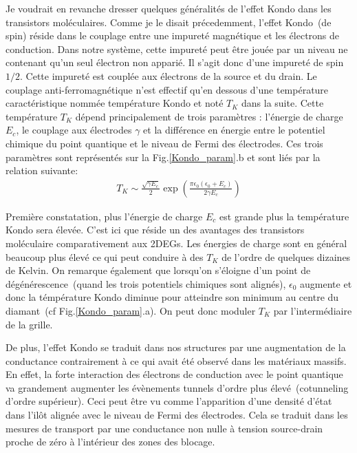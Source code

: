 Je voudrait en revanche dresser quelques généralités de l'effet Kondo dans les transistors moléculaires. Comme je le disait précedemment, l'effet Kondo~(de spin) réside dans le couplage entre une impureté magnétique et les électrons de conduction. Dans notre système, cette impureté peut être jouée par un niveau ne contenant qu'un seul électron non apparié. Il s'agit donc d'une impureté de spin $1/2$. Cette impureté est couplée aux électrons de la source et du drain. Le couplage anti-ferromagnétique n'est effectif qu'en dessous d'une température caractéristique nommée température Kondo et noté $T_K$ dans la suite. Cette température $T_K$ dépend principalement de trois paramètres : l'énergie de charge $E_c$, le couplage aux électrodes $\gamma$ et la différence en énergie entre le potentiel chimique du point quantique et le niveau de Fermi des électrodes. Ces trois paramètres sont représentés sur la Fig.\ref{Kondo_param}.b et sont liés par la relation suivante:
\begin{eqnarray}
T_K \sim \frac{\sqrt{\gamma E_c}}{2} \exp(\frac{\pi \epsilon_0(\epsilon_0 + E_c)}{2\gamma E_c})
\end{eqnarray}

Première constatation, plus l'énergie de charge $E_c$ est grande plus la température Kondo sera élevée. C'est ici que réside un des avantages des transistors moléculaire comparativement aux 2DEGs. Les énergies de charge sont en général beaucoup plus élevé ce qui peut conduire à des $T_K$ de l'ordre de quelques dizaines de Kelvin. On remarque également que lorsqu'on s'éloigne d'un point de dégénérescence~(quand les trois potentiels chimiques sont alignés), $\epsilon_0$ augmente et donc la témpérature Kondo diminue pour atteindre son minimum au centre du diamant~(cf Fig.\ref{Kondo_param}.a). On peut donc moduler $T_K$ par l'intermédiaire de la grille.

De plus, l'effet Kondo se traduit dans nos structures par une augmentation de la conductance contrairement à ce qui avait été observé dans les matériaux massifs. En effet, la forte interaction des électrons de conduction avec le point quantique va grandement augmenter les évènements tunnels d'ordre plus élevé~(cotunneling d'ordre supérieur). Ceci peut être vu comme l'apparition d'une densité d'état dans l'ilôt alignée avec le niveau de Fermi des électrodes. Cela se traduit dans les mesures de transport par une conductance non nulle à tension source-drain proche de zéro à l'intérieur des zones des blocage. 

